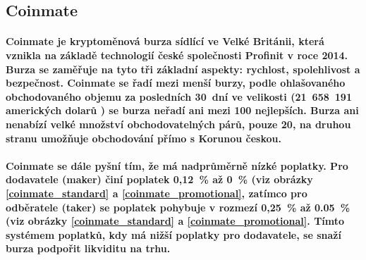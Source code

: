 \documentclass[thesis=B,czech]{FITthesis}[2019/03/21]
\begin{document}
\subsection{Coinmate}
\paragraph{
Coinmate je kryptoměnová burza sídlící ve Velké Británii, která vznikla na základě technologií české společnosti Profinit v roce 2014. Burza se zaměřuje na tyto tři základní aspekty: rychlost, spolehlivost a bezpečnost. Coinmate se řadí mezi menší burzy, podle ohlašovaného obchodovaného objemu za posledních 30~dní ve velikosti (21~658~191 amerických dolarů \cite{coin360}) se burza neřadí ani mezi 100 nejlepších. \cite{coinmarketcap} Burza ani nenabízí velké množství obchodovatelných párů, pouze 20, na druhou stranu umožňuje obchodování přímo s Korunou českou. 
}
\paragraph{
Coinmate se dále pyšní tím, že má nadprůměrně nízké poplatky. Pro dodavatele (maker) činí poplatek 0,12~\% až 0~\% (viz obrázky \ref{coinmate_standard} a \ref{coinmate_promotional}, zatímco pro odběratele (taker) se poplatek pohybuje v rozmezí 0,25~\% až 0.05~\% (viz obrázky \ref{coinmate_standard} a \ref{coinmate_promotional}. Tímto systémem poplatků, kdy má nižší poplatky pro dodavatele, se snaží burza podpořit likviditu na trhu. \cite{cryptowisser_coinmate} \cite{coinmate_fees}
}
\end{document}
